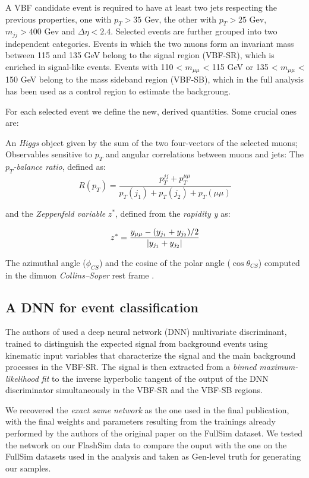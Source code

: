 A VBF candidate event is required to have at least two jets respecting the previous properties, one with $p_T>35$ Gev, the other with $p_T>25$ Gev, $m_{jj}>400$ Gev and $\Delta\eta<2.4$. Selected events are further grouped into two independent categories. Events in which the two muons form an invariant mass between 115 and
135 GeV belong to the signal region (VBF-SR), which is enriched in signal-like events. Events with 110 < $m_{\mu\mu}$ < 115 GeV or 135 < $m_{\mu\mu}$ < 150 GeV belong to the mass sideband region (VBF-SB), which in the full analysis has been used as a control region to estimate the backgroung.

For each selected event we define the new, derived quantities. Some crucial ones are:

\begin{outline}
\1 An \emph{Higgs} object given by the sum of the two four-vectors of the selected muons;
\1 Observables sensitive to $p_T$ and angular correlations between muons and jets: The $p_T$\emph{-balance ratio}, defined as:
\[R(p_T) = \frac{p_T^{jj}+p_T^{\mu\mu}}{p_T(j_1) + p_T(j_2) + p_T(\mu\mu)}\]

and the \emph{Zeppenfeld variable} $z^*$, defined from the \emph{rapidity y} as:

\[z^* = \frac{y_{\mu\mu} - (y_{j_1} + y_{j_2})/2}{\abs{y_{j_1} + y_{j_2}}}\]

\1  The azimuthal angle ($\phi_{CS}$) and the cosine of the polar angle ($\cos\theta_{CS}$) computed in the dimuon \emph{Collins–Soper} rest frame \cite{PhysRevD.16.2219}.
\end{outline}

\subsection{A DNN for event classification}
The authors of \cite{Sirunyan_2021} used a deep neural network (DNN) multivariate discriminant, trained to distinguish the expected signal from background events using kinematic input variables that characterize the signal and the main background processes in the VBF-SR. The signal is then extracted from a \emph{binned maximum-likelihood fit} to the inverse hyperbolic tangent of the output of the DNN discriminator simultaneously in the VBF-SR and the VBF-SB regions. 

We recovered the \emph{exact same network} as the one used in the final publication, with the final weights and parameters resulting from the trainings already performed by the authors of the original paper on the FullSim dataset. We tested the network on our FlashSim data to compare the ouput with the one on the FullSim datasets used in the analysis and taken as Gen-level truth for generating our samples.

